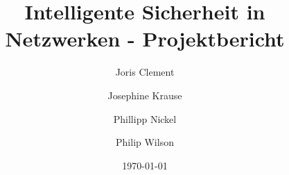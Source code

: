\documentclass[a4paper, 12pt]{article}
\title{Intelligente Sicherheit in Netzwerken - Projektbericht}
\author{Joris Clement
\and Josephine Krause
\and Phillipp Nickel
\and Philip Wilson}
\date{\today}
\begin{document}
\maketitle


\begin{abstract}

\end{abstract}

\newpage

\tableofcontents
\newpage













\newpage
\end{document}
